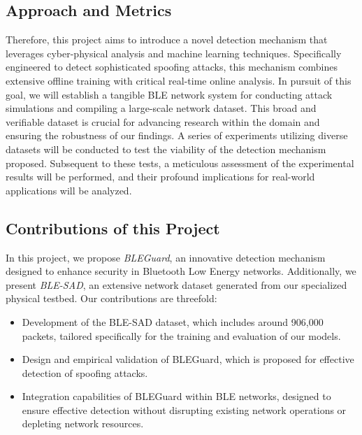 \vspace{4pt}

\subsection{Approach and Metrics}

\noindent Therefore, this project aims to introduce a novel detection mechanism that leverages cyber-physical analysis and machine learning techniques. Specifically engineered to detect sophisticated spoofing attacks, this mechanism combines extensive offline training with critical real-time online analysis. In pursuit of this goal, we will establish a tangible BLE network system for conducting attack simulations and compiling a large-scale network dataset. This broad and verifiable dataset is crucial for advancing research within the domain and ensuring the robustness of our findings. A series of experiments utilizing diverse datasets will be conducted to test the viability of the detection mechanism proposed. Subsequent to these tests, a meticulous assessment of the experimental results will be performed, and their profound implications for real-world applications will be analyzed.

\vspace{4pt}

\subsection{Contributions of this Project}

\noindent In this project, we propose \textit{BLEGuard}, an innovative detection mechanism designed to enhance security in Bluetooth Low Energy networks. Additionally, we present \textit{BLE-SAD}, an extensive network dataset generated from our specialized physical testbed. Our contributions are threefold:

\begin{itemize}[leftmargin=0.1cm]
    \setlength{\itemsep}{-0.1cm}
    \item Development of the BLE-SAD dataset, which includes around 906,000 packets, tailored specifically for the training and evaluation of our models.
    \item Design and empirical validation of BLEGuard, which is proposed for effective detection of spoofing attacks.
    \item Integration capabilities of BLEGuard within BLE networks, designed to ensure effective detection without disrupting existing network operations or depleting network resources.
\end{itemize}

